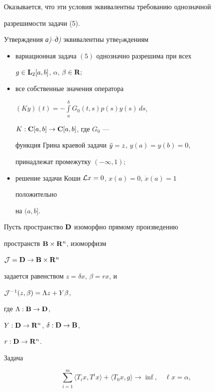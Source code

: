 Оказывается, что эти условия эквивалентны требованию однозначной


разрешимости задачи (5).





\begin{thm} Утверждения {\em а)--д)} эквивалентны утвеpждениям


\begin{itemize}


\item[1)] вариационная задача $(5)$ однозначно разрешима при всех


$g\in\bold L_2[a,b]$, $\alpha$, $\beta\in\bold R;$


\item[2)] все собственные значения оператора


$(Ky)(t)=-\int\limits_a^bG_0(t,s)p(s)y(s)\,ds$,


$K:\bold C[a,b]\to\bold C[a,b]$, где $G_0$ ---


функция Грина краевой задачи $\Ddot y=z$, $y(a)=y(b)=0$,


принадлежат промежутку $(-\infty,1);$


\item[3)] решение задачи Коши ${\cal L}x=0$, $x(a)=0$, $\Dot x(a)=1$


положительно


на $(a,b]$.


\end{itemize}


\end{thm}





Пусть пространство $\bold D$ изоморфно прямому произведению


пространств $\bold B\times\bold R^n$, изоморфизм


${\cal J}=\bold D\to\bold B\times\bold R^n$


задается равенством $z=\delta x$, $\beta=rx$, и


${\cal J}^{-1}(z,\beta)=\Lambda z+Y\beta$,


где $\Lambda:\bold B\to\bold D$,


$Y:\bold D\to\bold R^n$, $\delta:\bold D\to\bold B$,


$r:\bold D\to\bold R^n$.





Задача


\begin{equation}


\sum_{i=1}^m\langle T_ix,T^ix\rangle+


\langle T_0x,g\rangle\longrightarrow\inf,\quad


\ell x=\alpha,


\end{equation}



